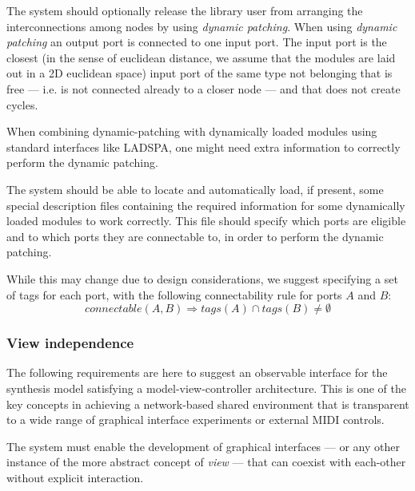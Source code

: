 \begin{requirement}
  The system should optionally release the library user from arranging
  the interconnections among nodes by using \emph{dynamic
    patching}. When using \emph{dynamic patching} an output port is
  connected to one input port. The input port is the closest (in the
  sense of euclidean distance, we assume that the modules are laid out
  in a 2D euclidean space) input port of the same type not belonging
  that is free --- i.e. is not connected already to a closer node ---
  and that does not create cycles.
\end{requirement}


When combining dynamic-patching with dynamically loaded modules
using standard interfaces like LADSPA, one might need extra
information to correctly perform the dynamic patching.

\begin{requirement}
  \label{req:iter3-end}
  The system should be able to locate and automatically load, if
  present, some special description files containing the required
  information for some dynamically loaded modules to work
  correctly. This file should specify which ports are eligible and to
  which ports they are connectable to, in order to perform the dynamic
  patching.
\end{requirement}

While this may change due to design considerations, we suggest
specifying a set of tags for each port, with the following
connectability rule for ports $A$ and $B$:
\begin{equation}
connectable(A, B)
\Rightarrow tags(A) \cap tags(B) \neq \emptyset
\end{equation}

\subsubsection{View independence}

The following requirements are here to suggest an observable interface
for the synthesis model satisfying a model-view-controller architecture. This is one of the key concepts
in achieving a network-based shared environment that is transparent to
a wide range of graphical interface experiments or external MIDI
controls.

\begin{requirement}
  \label{req:views}
  The system must enable the development of graphical interfaces
  --- or any other instance of the more abstract concept of
  \emph{view} --- that can coexist with each-other
  without explicit interaction.
\end{requirement}

